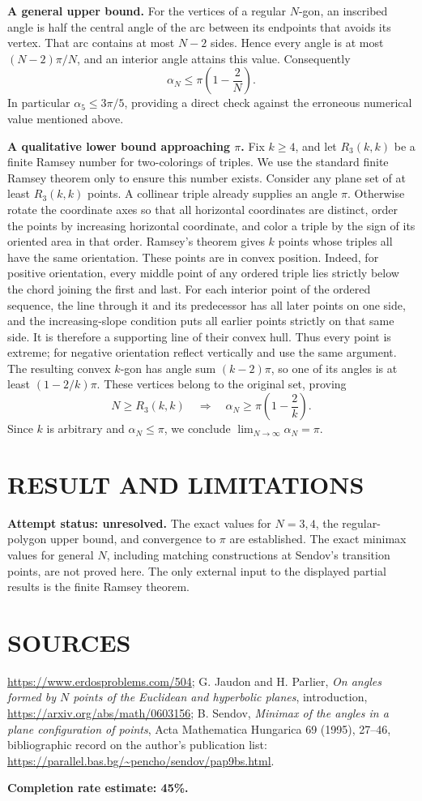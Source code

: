 \textbf{A general upper bound.} For the vertices of a regular $N$-gon, an inscribed angle is half the central angle of the arc between its endpoints that avoids its vertex. That arc contains at most $N-2$ sides. Hence every angle is at most $(N-2)\pi/N$, and an interior angle attains this value. Consequently
\[
 \alpha_N\leq\pi\left(1-\frac2N\right).
\]
In particular $\alpha_5\leq3\pi/5$, providing a direct check against the erroneous numerical value mentioned above.

\textbf{A qualitative lower bound approaching $\pi$.} Fix $k\geq4$, and let $R_3(k,k)$ be a finite Ramsey number for two-colorings of triples. We use the standard finite Ramsey theorem only to ensure this number exists. Consider any plane set of at least $R_3(k,k)$ points. A collinear triple already supplies an angle $\pi$. Otherwise rotate the coordinate axes so that all horizontal coordinates are distinct, order the points by increasing horizontal coordinate, and color a triple by the sign of its oriented area in that order.
Ramsey's theorem gives $k$ points whose triples all have the same orientation. These points are in convex position. Indeed, for positive orientation, every middle point of any ordered triple lies strictly below the chord joining the first and last. For each interior point of the ordered sequence, the line through it and its predecessor has all later points on one side, and the increasing-slope condition puts all earlier points strictly on that same side. It is therefore a supporting line of their convex hull. Thus every point is extreme; for negative orientation reflect vertically and use the same argument.
The resulting convex $k$-gon has angle sum $(k-2)\pi$, so one of its angles is at least $(1-2/k)\pi$. These vertices belong to the original set, proving
\[
 N\geq R_3(k,k)\quad\Longrightarrow\quad
 \alpha_N\geq\pi\left(1-\frac2k\right).
\]
Since $k$ is arbitrary and $\alpha_N\leq\pi$, we conclude $\lim_{N\to\infty}\alpha_N=\pi$.

\section{RESULT AND LIMITATIONS}
\textbf{Attempt status: unresolved.} The exact values for $N=3,4$, the regular-polygon upper bound, and convergence to $\pi$ are established. The exact minimax values for general $N$, including matching constructions at Sendov's transition points, are not proved here. The only external input to the displayed partial results is the finite Ramsey theorem.

\section{SOURCES}
\url{https://www.erdosproblems.com/504}; G. Jaudon and H. Parlier, \emph{On angles formed by $N$ points of the Euclidean and hyperbolic planes}, introduction, \url{https://arxiv.org/abs/math/0603156}; B. Sendov, \emph{Minimax of the angles in a plane configuration of points}, Acta Mathematica Hungarica 69 (1995), 27--46, bibliographic record on the author's publication list: \url{https://parallel.bas.bg/~pencho/sendov/pap9bs.html}.

\textbf{Completion rate estimate: 45\%.}
